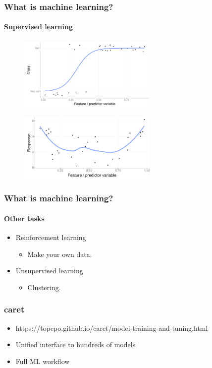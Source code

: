 \documentclass[handout, aspectratio = 169]{beamer}
\begin{document}
\begin{frame}
\frametitle{What is machine learning?}
\framesubtitle{Supervised learning}
\begin{figure}
    \includegraphics[width = 0.6\textwidth]{classification}
\end{figure} 
\begin{figure}

    \includegraphics[width = 0.6\textwidth]{regression}
\end{figure} 
\end{frame} 


\begin{frame}
\frametitle{What is machine learning?}
\framesubtitle{Other tasks}
\begin{itemize}
\item Reinforcement learning
\begin{itemize}
\item Make your own data.
\end{itemize}
\item Unsupervised learning
\begin{itemize}
\item Clustering.
\end{itemize}
\end{itemize}
\end{frame} 





\begin{frame}
\frametitle{caret}
\begin{itemize}
\item https://topepo.github.io/caret/model-training-and-tuning.html
\item Unified interface to hundreds of models
\item Full ML workflow
\end{itemize}

\end{frame} 
\end{document}
